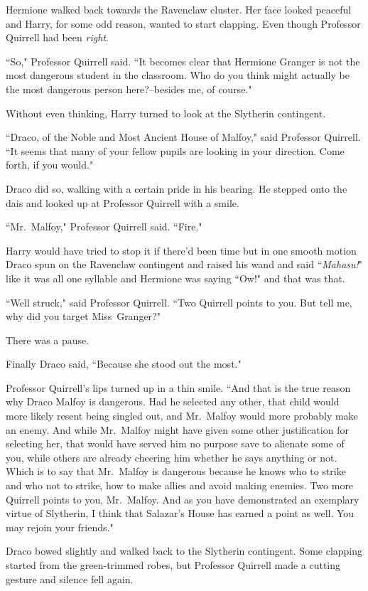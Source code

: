Hermione walked back towards the Ravenclaw cluster. Her face looked peaceful and Harry, for some odd reason, wanted to start clapping. Even though Professor Quirrell had been \emph{right}.

``So," Professor Quirrell said. ``It becomes clear that Hermione Granger is not the most dangerous student in the classroom. Who do you think might actually be the most dangerous person here?\---besides me, of course."

Without even thinking, Harry turned to look at the Slytherin contingent.

``Draco, of the Noble and Most Ancient House of Malfoy," said Professor Quirrell. ``It seems that many of your fellow pupils are looking in your direction. Come forth, if you would."

Draco did so, walking with a certain pride in his bearing. He stepped onto the dais and looked up at Professor Quirrell with a smile.

``Mr.~Malfoy," Professor Quirrell said. ``Fire."

Harry would have tried to stop it if there'd been time but in one smooth motion Draco spun on the Ravenclaw contingent and raised his wand and said ``\emph{Mahasu!}" like it was all one syllable and Hermione was saying ``Ow!" and that was that.

``Well struck," said Professor Quirrell. ``Two Quirrell points to you. But tell me, why did you target Miss~Granger?"

There was a pause.

Finally Draco said, ``Because she stood out the most."

Professor Quirrell's lips turned up in a thin smile. ``And that is the true reason why Draco Malfoy is dangerous. Had he selected any other, that child would more likely resent being singled out, and Mr.~Malfoy would more probably make an enemy. And while Mr.~Malfoy might have given some other justification for selecting her, that would have served him no purpose save to alienate some of you, while others are already cheering him whether he says anything or not. Which is to say that Mr.~Malfoy is dangerous because he knows who to strike and who not to strike, how to make allies and avoid making enemies. Two more Quirrell points to you, Mr.~Malfoy. And as you have demonstrated an exemplary virtue of Slytherin, I think that Salazar's House has earned a point as well. You may rejoin your friends."

Draco bowed slightly and walked back to the Slytherin contingent. Some clapping started from the green-trimmed robes, but Professor Quirrell made a cutting gesture and silence fell again.

